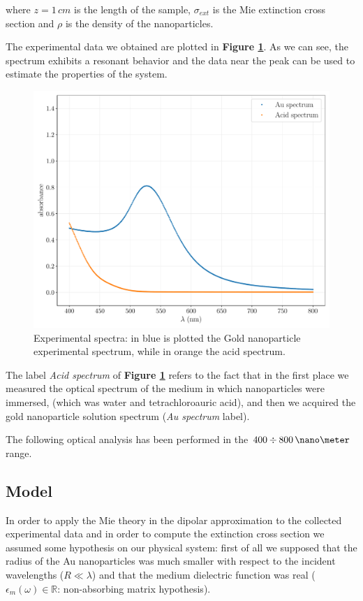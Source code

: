 \documentclass[twocolumn]{article}
\begin{document}
\begin{multicols}{2}
\noindent
where $z=1\, cm$ is the length of the sample, $\sigma_{ext}$ is the Mie extinction cross section and $\rho$ is the density of the nanoparticles.

The experimental data we obtained are plotted in \textbf{Figure \ref{fig:exp_data}}. As we can see, the spectrum exhibits a resonant behavior and the data near the peak can be used to estimate the properties of the system.

\begin{figure}[H]
    \centering
    \includegraphics[width=\linewidth]{image/data/exp_data.pdf}
    \caption{Experimental spectra: in blue is plotted the Gold nanoparticle experimental spectrum, while in orange the acid spectrum.}
    \label{fig:exp_data}
\end{figure}

The label \textit{Acid spectrum} of \textbf{Figure \ref{fig:exp_data}} refers to the fact that in the first place we measured the optical spectrum of the medium in which nanoparticles were immersed, (which was water and tetrachloroauric acid),  and then we acquired the gold
nanoparticle solution spectrum (\textit{Au spectrum} label).

The following optical analysis has been performed in the $400 \div 800\,\nano\meter$ range.

\subsection{Model}
In order to apply the Mie theory in the dipolar approximation to the collected experimental data and in order to compute the extinction cross section we assumed some hypothesis on our physical system: first of all we supposed that the radius of the Au nanoparticles was much smaller with respect to the incident wavelengths ($R\ll \lambda$) and that the medium dielectric function was real ($\epsilon_m(\omega) \in \mathbb{R}$: non-absorbing matrix hypothesis). 


\end{multicols}
\end{document}
